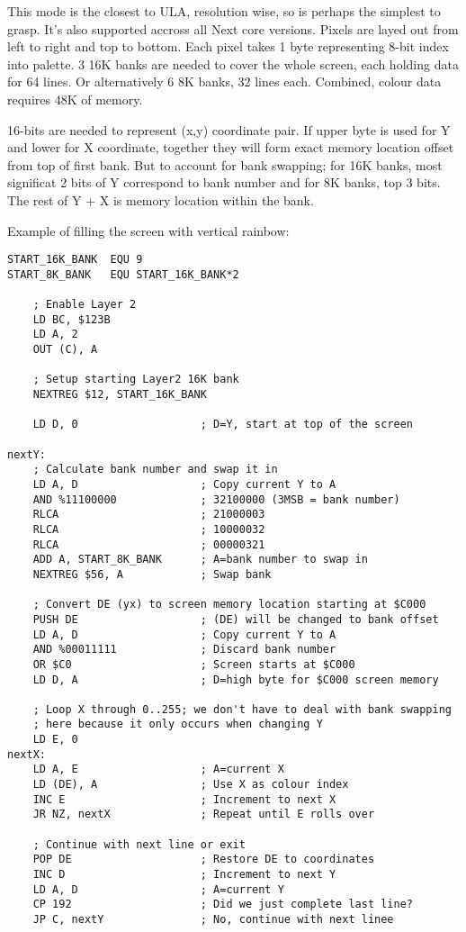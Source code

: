 \documentclass[12pt,twoside,openright,a4paper]{book}
\begin{document}
This mode is the closest to ULA, resolution wise, so is perhaps the simplest to grasp. It's also supported accross all Next core versions. Pixels are layed out from left to right and top to bottom. Each pixel takes 1 byte representing 8-bit index into palette. 3 16K banks are needed to cover the whole screen, each holding data for 64 lines. Or alternatively 6 8K banks, 32 lines each. Combined, colour data requires 48K of memory.

16-bits are needed to represent (x,y) coordinate pair. If upper byte is used for Y and lower for X coordinate, together they will form exact memory location offset from top of first bank. But to account for bank swapping; for 16K banks, most significat 2 bits of Y correspond to bank number and for 8K banks, top 3 bits. The rest of Y + X is memory location within the bank.

Example of filling the screen with vertical rainbow:

\begin{Verbatim}
START_16K_BANK  EQU 9
START_8K_BANK   EQU START_16K_BANK*2

	; Enable Layer 2
	LD BC, $123B
	LD A, 2
	OUT (C), A
    
    ; Setup starting Layer2 16K bank
    NEXTREG $12, START_16K_BANK
    
    LD D, 0                   ; D=Y, start at top of the screen
    
nextY:
    ; Calculate bank number and swap it in
    LD A, D                   ; Copy current Y to A
    AND %11100000             ; 32100000 (3MSB = bank number)
    RLCA                      ; 21000003
    RLCA                      ; 10000032
    RLCA                      ; 00000321
    ADD A, START_8K_BANK      ; A=bank number to swap in
    NEXTREG $56, A            ; Swap bank
    
    ; Convert DE (yx) to screen memory location starting at $C000
    PUSH DE                   ; (DE) will be changed to bank offset
    LD A, D                   ; Copy current Y to A
    AND %00011111             ; Discard bank number
    OR $C0                    ; Screen starts at $C000
    LD D, A                   ; D=high byte for $C000 screen memory

    ; Loop X through 0..255; we don't have to deal with bank swapping
    ; here because it only occurs when changing Y
    LD E, 0
nextX:
    LD A, E                   ; A=current X
    LD (DE), A                ; Use X as colour index
    INC E                     ; Increment to next X
    JR NZ, nextX              ; Repeat until E rolls over
    
    ; Continue with next line or exit
    POP DE                    ; Restore DE to coordinates
    INC D                     ; Increment to next Y
    LD A, D                   ; A=current Y
    CP 192                    ; Did we just complete last line?
    JP C, nextY               ; No, continue with next linee
\end{Verbatim}
\end{document}
